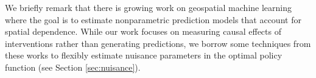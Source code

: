 \documentclass[12pt]{article}
\begin{document}
We briefly remark that there is growing work on geospatial machine learning  
\citep{sigrist2022gaussian,saha2023random,zhan2024neural} where the goal is to estimate nonparametric prediction models that account for spatial dependence. While our work focuses on measuring causal effects of interventions rather than generating predictions, we borrow some techniques from these works to flexibly estimate nuisance parameters in the optimal policy function (see Section \ref{sec:nuisance}). %



\end{document}

